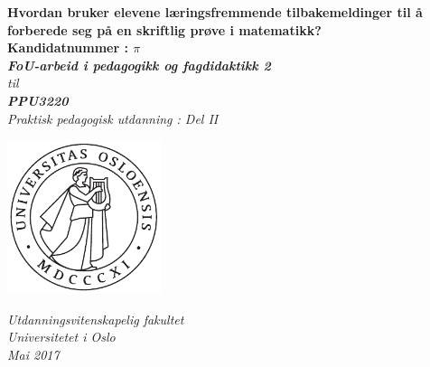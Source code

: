 \documentclass[main.tex]{subfiles}
\begin{document}
\thispagestyle{empty}
\begin{center}        %
  \vspace{5mm}        %
  \LARGE
  \textbf{Hvordan bruker elevene læringsfremmende tilbakemeldinger 
  til å forberede seg på en skriftlig prøve i matematikk? } \\
  \Large
  \vspace{10mm}
  \large
  \textbf{Kandidatnummer : $\pi$} \\
  \vspace{20mm}
  \Large
  {\bf{\textsl{FoU-arbeid i pedagogikk og fagdidaktikk 2}}} \\
  \textsl{til} \\
  \vspace{2mm}
  {\bf{\textsl{PPU3220}}} \\
  \vspace{5mm}
  {\large \textsl {Praktisk pedagogisk utdanning : Del II}}\\
  \vspace{10mm}
  \centerline{\includegraphics[width=45mm,height=45mm]{../figures/uiosegl.pdf}} 
  \vspace{8mm}
  \textsl{Utdanningsvitenskapelig fakultet} \\
  \textsl{Universitetet i Oslo} \\
  \vspace{5mm}
  \large
  \textsl{Mai 2017} \\
  \vspace{2cm}


\end{center}
\end{document}
